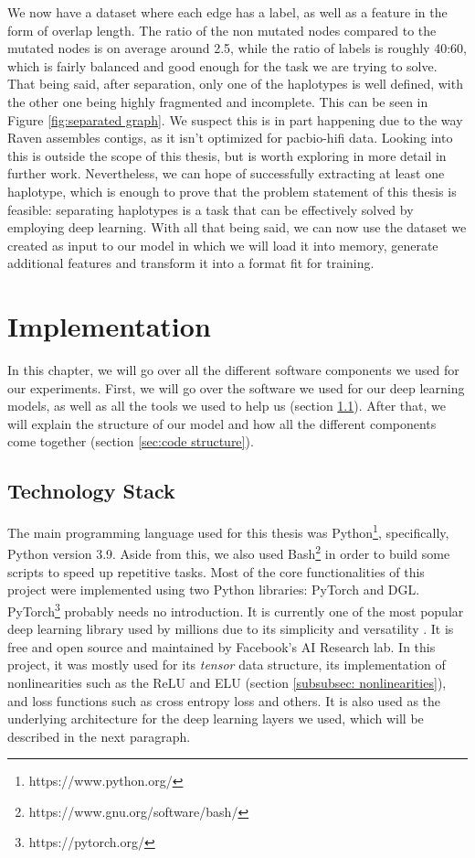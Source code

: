 \documentclass[times, utf8, diplomski, english]{fer_eng}
\begin{document}
We now have a dataset where each edge has a label, as well as a feature in the form of overlap length. The ratio of the non mutated nodes compared to the mutated nodes is on average around 2.5, while the ratio of labels is roughly 40:60, which is fairly balanced and good enough for the task we are trying to solve. That being said, after separation, only one of the haplotypes is well defined, with the other one being highly fragmented and incomplete. This can be seen in Figure \ref{fig:separated graph}. We suspect this is in part happening due to the way Raven assembles contigs, as it isn't optimized for pacbio-hifi data. Looking into this is outside the scope of this thesis, but is worth exploring in more detail in further work. Nevertheless, we can hope of successfully extracting at least one haplotype, which is enough to prove that the problem statement of this thesis is feasible: separating haplotypes is a task that can be effectively solved by employing deep learning. With all that being said, we can now use the dataset we created as input to our model in which we will load it into memory, generate additional features and transform it into a format fit for training.

\chapter{Implementation}

In this chapter, we will go over all the different software components we used for our experiments. First, we will go over the software we used for our deep learning models, as well as all the tools we used to help us (section \ref{sec:technology stack}). After that, we will explain the structure of our model and how all the different components come together (section \ref{sec:code structure}).

\section{Technology Stack}
\label{sec:technology stack}

The main programming language used for this thesis was Python\footnote{https://www.python.org/}, specifically, Python version 3.9. Aside from this, we also used Bash\footnote{https://www.gnu.org/software/bash/} in order to build some scripts to speed up repetitive tasks. Most of the core functionalities of this project were implemented using two Python libraries: PyTorch and DGL. PyTorch\footnote{https://pytorch.org/} probably needs no introduction. It is currently one of the most popular deep learning library used by millions due to its simplicity and versatility \cite{popular_ml}. It is free and open source and maintained by Facebook's AI Research lab. In this project, it was mostly used for its \textit{tensor} data structure, its implementation of nonlinearities such as the ReLU and ELU (section \ref{subsubsec: nonlinearities}), and loss functions such as cross entropy loss and others. It is also used as the underlying architecture for the deep learning layers we used, which will be described in the next paragraph.
\end{document}
